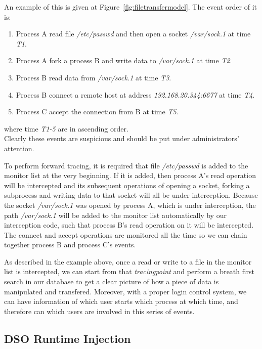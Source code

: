 \documentclass[letterpaper,twocolumn,10pt]{article}
\begin{document}
An example of this is given at Figure~\ref{fig:filetransfermodel}. The event
order of it is:

\begin{enumerate}
    \item Process A read file \textit{/etc/passwd} and then open a socket
        \textit{/var/sock.1} at time \textit{T1}.
    \item Process A fork a process B and write data to \textit{/var/sock.1} at
        time \textit{T2}.
    \item Process B read data from \textit{/var/sock.1} at time \textit{T3}. 
    \item Process B connect a remote host at address
        \textit{192.168.20.344:6677} at time \textit{T4}.
    \item Process C accept the connection from B at time \textit{T5}.
\end{enumerate}

where time \textit{T1-5} are in ascending order.\\

Clearly these events are suspicious and should be put under administrators'
attention.

To perform forward tracing, it is required that file \textit{/etc/passwd} is
added to the monitor list at the very beginning. If it is added, then process
A's read operation will be intercepted and its subsequent operations of
opening a socket, forking a subprocess and writing data to that socket will
all be under interception. Because the socket \textit{/var/sock.1} was opened
by process A, which is under interception, the path \textit{/var/sock.1} will
be added to the monitor list automatically by our interception code, such that
process B's read operation on it will be intercepted. The connect and accept
operations are monitored all the time so we can chain together process B and
process C's events. %

As described in the example above, once a read or write to a file in the
monitor list is intercepted, we can start from that \textit{tracingpoint} and
perform a breath first search in our database to get a clear picture of how a
piece of data is manipulated and transfered. Moreover, with a proper login
control system, we can have information of which user starts which process at
which time, and therefore can which users are involved in this series of
events.

\subsection{DSO Runtime Injection} \label{sec:dso}
\end{document}
